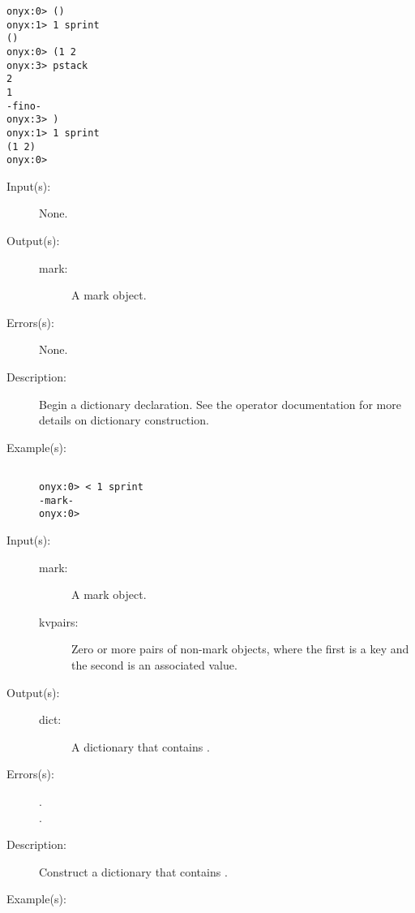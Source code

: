 \begin{description}
\begin{description}
\begin{verbatim}
onyx:0> ()
onyx:1> 1 sprint
()
onyx:0> (1 2
onyx:3> pstack
2
1
-fino-
onyx:3> )
onyx:1> 1 sprint
(1 2)
onyx:0>
		\end{verbatim}
	\end{description}
\label{systemdict:sym_lt}
\item[{\onyxop{--}{{\lt}}{mark}}: ]
	\begin{description}\item[]
	\item[Input(s): ] None.
	\item[Output(s): ]
		\begin{description}\item[]
		\item[mark: ]
			A mark object.
		\end{description}
	\item[Errors(s): ] None.
	\item[Description: ]
		Begin a dictionary declaration.  See the
		 operator
		documentation for more details on dictionary construction.
	\item[Example(s): ]\begin{verbatim}

onyx:0> < 1 sprint
-mark-
onyx:0>
		\end{verbatim}
	\end{description}
\label{systemdict:sym_gt}
\item[{\onyxop{mark kvpairs}{{\gt}}{dict}}: ]
	\begin{description}\item[]
	\item[Input(s): ]
		\begin{description}\item[]
		\item[mark: ]
			A mark object.
		\item[kvpairs: ]
			Zero or more pairs of non-mark objects, where the first
			is a key and the second is an associated value.
		\end{description}
	\item[Output(s): ]
		\begin{description}\item[]
		\item[dict: ]
			A dictionary that contains .
		\end{description}
	\item[Errors(s): ]
		\begin{description}\item[]
		\item[.]
		\item[.]
		\end{description}
	\item[Description: ]
		Construct a dictionary that contains .
	\item[Example(s): ]\begin{verbatim}


\end{verbatim}
\end{description}
\end{description}

